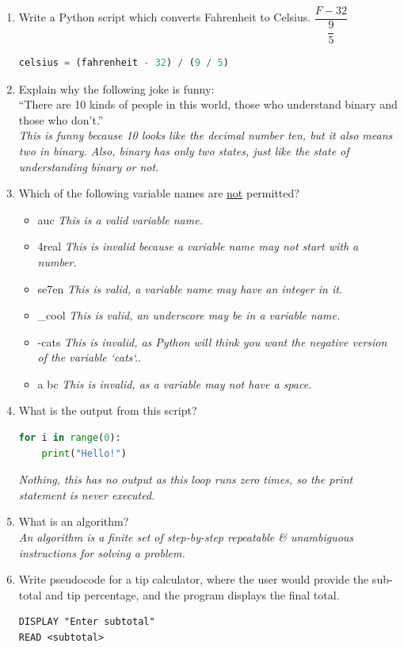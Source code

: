 \documentclass[letter,10pt]{article}
\newcommand*\tick{\item[\Checkmark]}
\newcommand*\fail{\item[\XSolidBrush]}
\begin{document}
\begin{enumerate}
    \item Write a Python script which converts Fahrenheit to Celsius. $\dfrac{F - 32}{\dfrac{9}{5}}$
    \begin{lstlisting}[language=python]
celsius = (fahrenheit - 32) / (9 / 5)
    \end{lstlisting}
    
    \item Explain why the following joke is funny: \\
    ``There are 10 kinds of people in this world, those who understand binary and those who don't.'' \\
    \textit{This is funny because 10 looks like the decimal number ten, but it also means two in binary. Also, binary has only two states, just like the state of understanding binary or not.}
    
    \item Which of the following variable names are \underline{not} permitted?
    \begin{itemize}
        \fail auc \textit{This is a valid variable name.}
        \tick 4real \textit{This is invalid because a variable name may not start with a number.}
        \fail se7en \textit{This is valid, a variable name may have an integer in it.}
        \fail \_cool \textit{This is valid, an underscore may be in a variable name.}
        \tick -cats \textit{This is invalid, as Python will think you want the negative version of the variable `cats`.}.
        \tick a bc \textit{This is invalid, as a variable may not have a space.}
    \end{itemize}

    \item What is the output from this script?
    \begin{lstlisting}[language=python]
for i in range(0):
    print("Hello!")
    \end{lstlisting}
    \textit{Nothing, this has no output as this loop runs zero times, so the print statement is never executed.}
    
    \item What is an algorithm? \\
    \textit{An algorithm is a finite set of step-by-step repeatable \& unambiguous instructions for solving a problem.}
    
    \item Write pseudocode for a tip calculator, where the user would provide the sub-total and tip percentage, and the program displays the final total.
    \begin{verbatim}
DISPLAY "Enter subtotal"
READ <subtotal>


\end{verbatim}
\end{enumerate}
\end{document}

